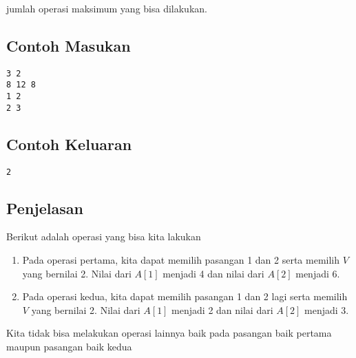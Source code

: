 \documentclass{article}
\begin{document}
jumlah operasi maksimum yang bisa dilakukan.
\\

\begin{multicols}{2}
\subsection*{Contoh Masukan}
\begin{lstlisting}
3 2
8 12 8
1 2
2 3

\end{lstlisting}
\columnbreak
\subsection*{Contoh Keluaran}
\begin{lstlisting}
2
\end{lstlisting}
\vfill
\null
\end{multicols}

\subsection*{Penjelasan}
Berikut adalah operasi yang bisa kita lakukan
\begin{enumerate}
    \item Pada operasi pertama, kita dapat memilih pasangan 1 dan 2 serta memilih $V$ yang bernilai 2. Nilai dari $A[1]$ menjadi 4 dan nilai dari $A[2]$ menjadi 6.
    \item Pada operasi kedua, kita dapat memilih pasangan 1 dan 2 lagi serta memilih $V$ yang bernilai 2. Nilai dari $A[1]$ menjadi 2 dan nilai dari $A[2]$ menjadi 3.
\end{enumerate}
Kita tidak bisa melakukan operasi lainnya baik pada pasangan baik pertama maupun pasangan baik kedua

\pagebreak
\end{document}
